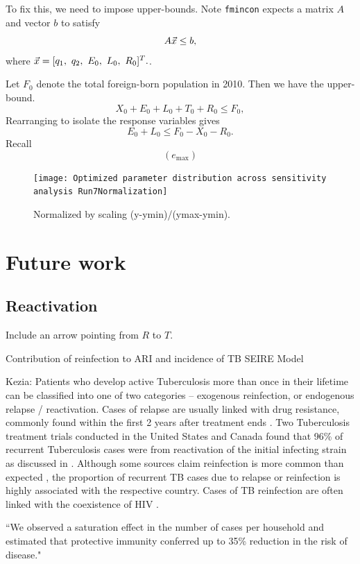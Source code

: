 \documentclass[sn-mathphys,Numbered]{sn-jnl}%
\theoremstyle{thmstyleone}%
\theoremstyle{thmstyletwo}%
\theoremstyle{thmstylethree}%
\begin{document}
To fix this, we need to impose upper-bounds.  Note \texttt{fmincon} expects a matrix $A$ and vector $b$ to satisfy
$$ A\vec{x} \leq b, $$
where $\vec{x} = [q_1,~q_2,~E_0,~L_0,~R_0]^T.$.

Let $F_0$ denote the total foreign-born population in 2010.  Then we have the upper-bound.
$$ X_0 + E_0 + L_0 + T_0 + R_0 \leq F_0, $$
Rearranging to isolate the response variables gives
$$ E_0 + L_0 \leq F_0 - X_0 - R_0. $$
Recall 
$$ (e_\max ) $$


\begin{figure}
	\centering
	\texttt{[image: Optimized parameter distribution across sensitivity analysis Run7Normalization]}
	
	\caption{Normalized by scaling (y-ymin)/(ymax-ymin).}
	
	\label{fig:Histo7}
\end{figure}


\section{Future work}

\subsection{Reactivation}
Include an arrow pointing from $R$ to $T$.

Contribution of reinfection to ARI and incidence of TB \cite{Horsburgh2022ContributionDisease}
SEIRE Model\cite{Sulayman2023DynamicsIssues}

Kezia: 
Patients who develop active Tuberculosis more than once in their lifetime can be classified into one of two categories -- exogenous reinfection, or endogenous relapse / reactivation. Cases of relapse are usually linked with drug resistance, commonly found within the first 2 years after treatment ends \cite{Zong2018RelapseChina} \cite{Guerra-Assunção2015RecurrenceFollow-up}. Two Tuberculosis treatment trials conducted in the United States and Canada found that 96\% of recurrent Tuberculosis cases were from reactivation of the initial infecting strain as discussed in \cite{Jasmer2004RecurrentReinfection} . Although some sources claim reinfection is more common than expected \cite{Hoey2002CanTwice}, the proportion of recurrent TB cases due to relapse or reinfection is highly associated with the respective country. Cases of TB reinfection are often linked with the coexistence of HIV \cite{Campbell2022ChapterInfection.}. 

\cite{Brooks-Pollock2011} ``We observed a saturation effect in the number of cases per household and estimated that protective immunity conferred up to 35\% reduction in the risk of disease."
\end{document}
